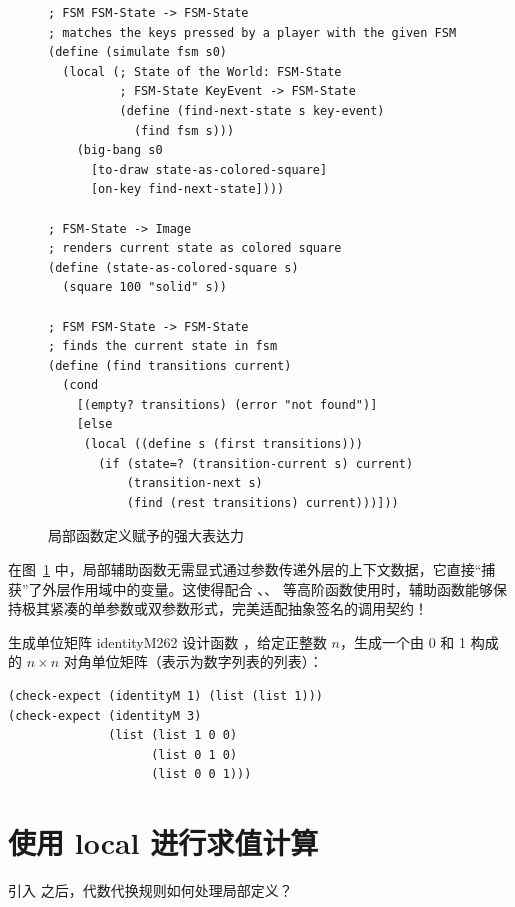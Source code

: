 \begin{figure}[htbp]
  \centering
\begin{lstlisting}[language=BSL, basicstyle=\scriptsize\ttfamily]
; FSM FSM-State -> FSM-State
; matches the keys pressed by a player with the given FSM
(define (simulate fsm s0)
  (local (; State of the World: FSM-State
          ; FSM-State KeyEvent -> FSM-State
          (define (find-next-state s key-event)
            (find fsm s)))
    (big-bang s0
      [to-draw state-as-colored-square]
      [on-key find-next-state])))

; FSM-State -> Image
; renders current state as colored square
(define (state-as-colored-square s)
  (square 100 "solid" s))

; FSM FSM-State -> FSM-State
; finds the current state in fsm
(define (find transitions current)
  (cond
    [(empty? transitions) (error "not found")]
    [else
     (local ((define s (first transitions)))
       (if (state=? (transition-current s) current)
           (transition-next s)
           (find (rest transitions) current)))]))
\end{lstlisting}
  \caption{局部函数定义赋予的强大表达力}
  \label{fig:102}
\end{figure}

在图~\ref{fig:102} 中，局部辅助函数无需显式通过参数传递外层的上下文数据，它直接“捕获”了外层作用域中的变量。这使得配合 、、 等高阶函数使用时，辅助函数能够保持极其紧凑的单参数或双参数形式，完美适配抽象签名的调用契约！

\begin{exercise}{生成单位矩阵 identityM}{262}
设计函数 ，给定正整数 $n$，生成一个由 0 和 1 构成的 $n \times n$ 对角单位矩阵（表示为数字列表的列表）：
\begin{lstlisting}[language=BSL]
(check-expect (identityM 1) (list (list 1)))
(check-expect (identityM 3)
              (list (list 1 0 0)
                    (list 0 1 0)
                    (list 0 0 1)))
\end{lstlisting}
\end{exercise}

\section{使用 local 进行求值计算}
\label{sec:16_4}

引入  之后，代数代换规则如何处理局部定义？

